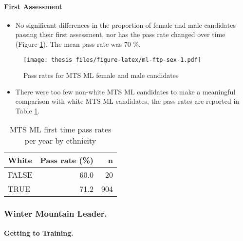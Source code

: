 \documentclass[
  12pt,
  a4paper,
]{book}
\providecommand{\tightlist}{%
  \setlength{\itemsep}{0pt}\setlength{\parskip}{0pt}}
\begin{document}
\hypertarget{mts-part-a-first-assessment-ml}{%
\paragraph{First Assessment}\label{mts-part-a-first-assessment-ml}}

\begin{itemize}
\tightlist
\item
  No significant differences in the proportion of female and male candidates passing their first assessment, nor has the pass rate changed over time (Figure \ref{fig:ml-ftp-sex}). The mean pass rate was 70 \%.
\end{itemize}

\begin{figure}
\centering
\texttt{[image: thesis\_files/figure-latex/ml-ftp-sex-1.pdf]}
\caption{\label{fig:ml-ftp-sex}Pass rates for MTS ML female and male candidates}
\end{figure}

\begin{itemize}
\tightlist
\item
  There were too few non-white MTS ML candidates to make a meaningful comparison with white MTS ML candidates, the pass rates are reported in Table \ref{tab:ml-ftp-tab-ethnicity}.
\end{itemize}

\begin{table}

\caption{\label{tab:ml-ftp-tab-ethnicity}MTS ML first time pass rates per year by ethnicity}
\centering
\begin{tabular}[t]{lrr}
\toprule
White & Pass 
rate (\%) & n\\
\midrule
FALSE & 60.0 & 20\\
\cmidrule{1-3}
TRUE & 71.2 & 904\\
\bottomrule
\end{tabular}
\end{table}

\hypertarget{mts-part-a-winter-ml}{%
\subsubsection{Winter Mountain Leader.}\label{mts-part-a-winter-ml}}

\hypertarget{mts-part-a-getting-to-training-wml}{%
\paragraph{Getting to Training.}\label{mts-part-a-getting-to-training-wml}}
\end{document}
